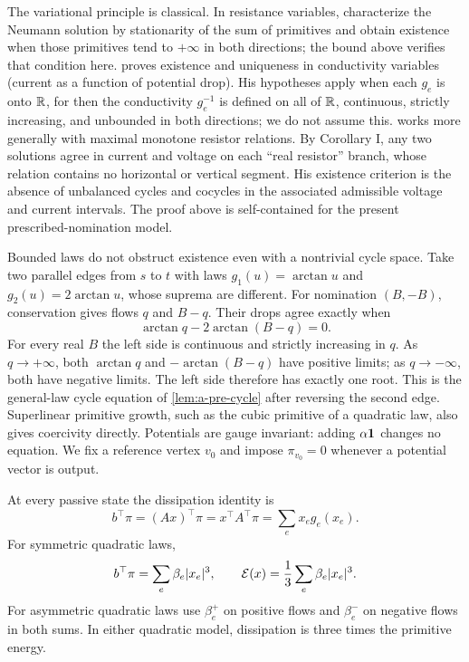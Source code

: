 The variational principle is classical. In resistance variables,
\citet[Section 5, Theorems $2'$ and $3'$]{birkhoff1956-non-linear-network-problems}
characterize the Neumann solution by stationarity of the sum of
primitives and obtain existence when those primitives tend to $+\infty$
in both directions; the bound above verifies that condition here.
\citet[Theorems 2 and 3]{duffin1947-nonlinear-networks-iia} proves existence
and uniqueness in conductivity variables (current as a function of
potential drop). His hypotheses apply when each $g_e$ is onto $\mathbb{R}$, for then the
conductivity $g_e^{-1}$ is defined on all of $\mathbb{R}$, continuous, strictly
increasing, and unbounded in both directions; we do not assume this.
\citet[Theorem 6.4 with its Corollary I, and the corollary to Theorem 8.1]{minty1960-monotone-networks}
works more generally with maximal monotone resistor relations.
By Corollary I, any two solutions agree in current and voltage on each
``real resistor'' branch, whose relation contains no horizontal or
vertical segment. His existence criterion is the absence of unbalanced
cycles and cocycles in the associated admissible voltage and current
intervals. The proof above is self-contained for the present
prescribed-nomination model.

\begin{remark}
\label{rem:a-pre-gauge}
Bounded laws do not obstruct existence even with a nontrivial cycle
space. Take two parallel edges from $s$ to $t$ with laws
$g_1(u)=\arctan u$ and $g_2(u)=2\arctan u$, whose suprema are different.
For nomination $(B,-B)$, conservation gives flows $q$ and $B-q$.
Their drops agree exactly when
\[
 \arctan q-2\arctan(B-q)=0.
\]
For every real $B$ the left side is continuous and strictly increasing
in $q$. As $q\to+\infty$, both $\arctan q$ and $-\arctan(B-q)$
have positive limits; as $q\to-\infty$, both have negative limits.
The left side therefore has exactly one root. This is the general-law cycle
equation of \cref{lem:a-pre-cycle} after reversing the second edge.
Superlinear primitive growth, such as the cubic primitive of a quadratic
law, also gives coercivity directly. Potentials are gauge invariant:
adding $\alpha\mathbf{1}$ changes no equation. We fix a reference vertex $v_0$
and impose $\pi_{v_0}=0$ whenever a potential vector is output.
\end{remark}

At every passive state the dissipation identity is
\begin{equation}
 b^\top\pi=(Ax)^\top\pi=x^\top A^\top\pi
           =\sum_e x_e g_e(x_e).
 \label{eq:a-pre-dissipation}
\end{equation}
For symmetric quadratic laws,
\[
 b^\top\pi=\sum_e\beta_e|x_e|^3,\qquad
 \mathcal{E}(x)=\frac13\sum_e\beta_e|x_e|^3.
\]
For asymmetric quadratic laws use
$\beta_e^+$ on positive flows and $\beta_e^-$ on negative flows in both
sums. In either quadratic model, dissipation is three times the
primitive energy.

